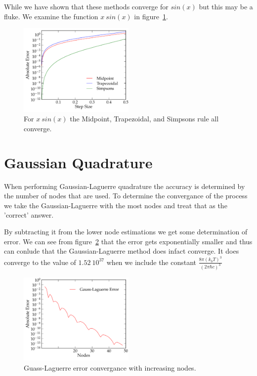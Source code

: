 \documentclass[11pt,letterpaper]{article}
\begin{document}
While we have shown that these methods converge for $sin(x)$ but this may be a 
fluke. We examine the function $x\ sin(x)$ in figure~\ref{fig:xsinx}. 

\begin{figure}[bth]
\centering
\includegraphics[width=0.5\textwidth]{1b.pdf}
\caption{For $x\ sin(x)$ the Midpoint, Trapezoidal, 
            and Simpsons rule all converge.}
\label{fig:xsinx}
\end{figure}

\section{Gaussian Quadrature}

When performing Gaussian-Laguerre quadrature the accuracy is determined by the
number of nodes that are used. To determine the convergance of the process
we take the Gaussian-Laguerre with the most nodes and treat that as the
'correct' answer. 

By subtracting it from the lower node estimations we get some determination of 
error. We can see from figure~\ref{fig:gauss_lag_error} that the error gets
exponentially smaller and thus can conlude that the Gaussian-Laguerre method
does infact converge. It does converge to the value of $1.52\ 10 ^{37}$ when we 
include the constant $\frac{8\pi(k_b T)^3}{(2 \pi \hbar c)^3}$

\begin{figure}[bth]
\centering
\includegraphics[width=0.5\textwidth]{2a.pdf}
\caption{Guass-Laguerre error convergance with increasing nodes.}
\label{fig:gauss_lag_error}
\end{figure}
\end{document}
